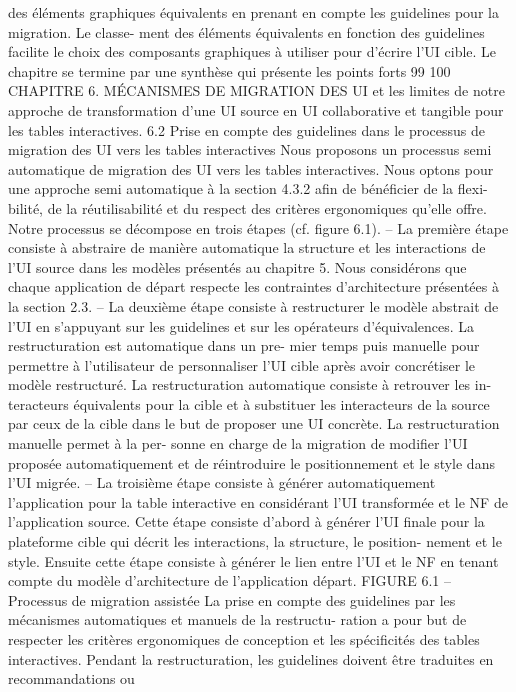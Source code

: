 \documentclass{article}
\begin{document}
des éléments graphiques équivalents en prenant en compte les guidelines pour la migration. Le classe-
ment des éléments équivalents en fonction des guidelines facilite le choix des composants graphiques
à utiliser pour d’écrire l’UI cible. Le chapitre se termine par une synthèse qui présente les points forts
99
100
CHAPITRE 6. MÉCANISMES DE MIGRATION DES UI
et les limites de notre approche de transformation d’une UI source en UI collaborative et tangible pour
les tables interactives.
6.2
Prise en compte des guidelines dans le processus de migration des
UI vers les tables interactives
Nous proposons un processus semi automatique de migration des UI vers les tables interactives.
Nous optons pour une approche semi automatique à la section 4.3.2 aﬁn de bénéﬁcier de la ﬂexi-
bilité, de la réutilisabilité et du respect des critères ergonomiques qu’elle offre. Notre processus se
décompose en trois étapes (cf. ﬁgure 6.1).
– La première étape consiste à abstraire de manière automatique la structure et les interactions de
l’UI source dans les modèles présentés au chapitre 5. Nous considérons que chaque application
de départ respecte les contraintes d’architecture présentées à la section 2.3.
– La deuxième étape consiste à restructurer le modèle abstrait de l’UI en s’appuyant sur les
guidelines et sur les opérateurs d’équivalences. La restructuration est automatique dans un pre-
mier temps puis manuelle pour permettre à l’utilisateur de personnaliser l’UI cible après avoir
concrétiser le modèle restructuré. La restructuration automatique consiste à retrouver les in-
teracteurs équivalents pour la cible et à substituer les interacteurs de la source par ceux de la
cible dans le but de proposer une UI concrète. La restructuration manuelle permet à la per-
sonne en charge de la migration de modiﬁer l’UI proposée automatiquement et de réintroduire
le positionnement et le style dans l’UI migrée.
– La troisième étape consiste à générer automatiquement l’application pour la table interactive
en considérant l’UI transformée et le NF de l’application source. Cette étape consiste d’abord à
générer l’UI ﬁnale pour la plateforme cible qui décrit les interactions, la structure, le position-
nement et le style. Ensuite cette étape consiste à générer le lien entre l’UI et le NF en tenant
compte du modèle d’architecture de l’application départ.
FIGURE 6.1 – Processus de migration assistée
La prise en compte des guidelines par les mécanismes automatiques et manuels de la restructu-
ration a pour but de respecter les critères ergonomiques de conception et les spéciﬁcités des tables
interactives. Pendant la restructuration, les guidelines doivent être traduites en recommandations ou
\end{document}
